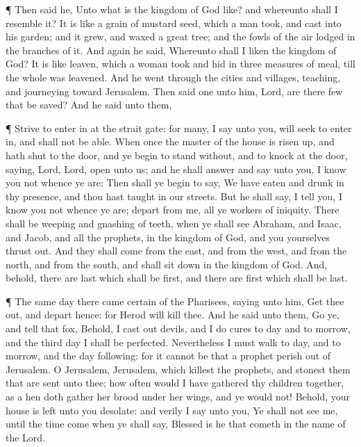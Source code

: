  ¶ Then said he, Unto what is the kingdom of God like? and
whereunto shall I resemble it?  It is like a grain of
mustard seed, which a man took, and cast into his garden; and it grew,
and waxed a great tree; and the fowls of the air lodged in the branches
of it.  And again he said, Whereunto shall I liken the
kingdom of God?  It is like leaven, which a woman took and
hid in three measures of meal, till the whole was leavened.
 And he went through the cities and villages, teaching, and
journeying toward Jerusalem.  Then said one unto him, Lord,
are there few that be saved? And he said unto them,

 ¶ Strive to enter in at the strait gate: for many, I say
unto you, will seek to enter in, and shall not be able. 
When once the master of the house is risen up, and hath shut to the
door, and ye begin to stand without, and to knock at the door, saying,
Lord, Lord, open unto us; and he shall answer and say unto you, I know
you not whence ye are:  Then shall ye begin to say, We have
eaten and drunk in thy presence, and thou hast taught in our streets.
 But he shall say, I tell you, I know you not whence ye
are; depart from me, all ye workers of iniquity.  There
shall be weeping and gnashing of teeth, when ye shall see Abraham, and
Isaac, and Jacob, and all the prophets, in the kingdom of God, and you
yourselves thrust out.  And they shall come from the east,
and from the west, and from the north, and from the south, and shall sit
down in the kingdom of God.  And, behold, there are last
which shall be first, and there are first which shall be last.

 ¶ The same day there came certain of the Pharisees, saying
unto him, Get thee out, and depart hence: for Herod will kill thee.
 And he said unto them, Go ye, and tell that fox, Behold, I
cast out devils, and I do cures to day and to morrow, and the third day
I shall be perfected.  Nevertheless I must walk to day, and
to morrow, and the day following: for it cannot be that a prophet perish
out of Jerusalem.  O Jerusalem, Jerusalem, which killest
the prophets, and stonest them that are sent unto thee; how often would
I have gathered thy children together, as a hen doth gather her brood
under her wings, and ye would not!  Behold, your house is
left unto you desolate: and verily I say unto you, Ye shall not see me,
until the time come when ye shall say, Blessed is he that cometh in the
name of the Lord.

